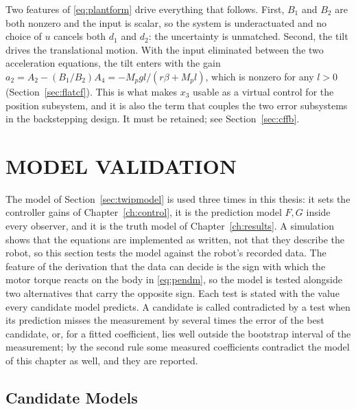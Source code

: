 \begin{remark}
Two features of \eqref{eq:plantform} drive everything that follows. First,
$B_1$ and $B_2$ are both nonzero and the input is scalar, so the system is
underactuated and no choice of $u$ cancels both $d_1$ and $d_2$: the uncertainty
is unmatched. Second, the tilt drives the translational motion. With the input
eliminated between the two acceleration equations, the tilt enters with the gain
$a_2=A_2-(B_1/B_2)A_4=-M_pgl/(r\beta+M_pl)$, which is nonzero for any $l>0$
(Section~\ref{sec:flatcf}). This is what makes $x_3$ usable as a virtual control
for the position subsystem, and it is also the term that couples the two error
subsystems in the backstepping design. It must be retained; see
Section~\ref{sec:cffb}.
\end{remark}

\section{MODEL VALIDATION}
\label{sec:modelsim}

The model of Section~\ref{sec:twipmodel} is used three times in this
thesis: it sets the controller gains of Chapter~\ref{ch:control}, it is the
prediction model $F,G$ inside every observer, and it is the truth model of
Chapter~\ref{ch:results}. A simulation shows that the equations are implemented
as written, not that they describe the robot, so this section tests the model
against the robot's recorded data. The feature of the derivation that the data
can decide is the sign with which the motor torque reacts on the body in
\eqref{eq:pendm}, so the model is tested alongside two alternatives that carry
the opposite sign. Each test is stated with the value every candidate model
predicts. A candidate is called contradicted by a test when its prediction
misses the measurement by several times the error of the best candidate, or,
for a fitted coefficient, lies well outside the bootstrap interval of the
measurement; by the second rule some measured coefficients contradict the model
of this chapter as well, and they are reported.

\subsection{Candidate Models}
\label{sec:candidates}

